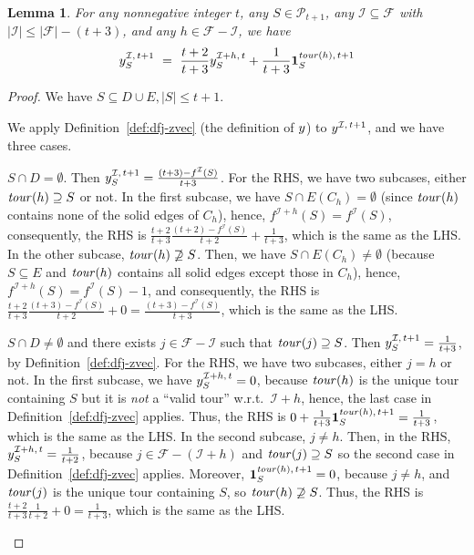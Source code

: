 \documentclass[11pt]{article}
\newtheorem{lemma}[theorem]{Lemma}
\newcommand{\pop}{\mathcal{P}}
\newcommand{\fracset}{\mathcal{F}}
\newcommand{\sgn}{\mathcal{I}}
\newcommand{\onevec}[2]{\textbf{1}^{#1,\,#2}}		\newcommand{\goodfrac}[2]{F^{#1}(#2)}	\newcommand{\szgoodfrac}[2]{f^{#1}(#2)}	\newcommand{\cindex}[1]{\textit{index}(#1)} \newcommand{\indfrac}{h}	\newcommand{\tour}{\textit{tour\/}}
\begin{document}
\begin{lemma}
\label{lemma:dfj-recursive}
For any nonnegative integer $t$,
any $S\in\pop_{t+1}$,
any $\sgn\subseteq \fracset$ with $|\sgn|\leq |\fracset| - (t+3)$,
and any $\indfrac\in\fracset-\sgn$,
we have
\begin{align}
\zvec{\sgn}{t+1}_S ~=~ \frac{t+2}{t+3} \zvec{\sgn+\indfrac}{t}_S +
	\frac{1}{t+3}\onevec{\tour(\indfrac)}{t+1}_S
\end{align}
\end{lemma}
\begin{proof}
We have $S\subseteq D\cup{E}, |S|\leq{t+1}$.

We apply Definition~\ref{def:dfj-zvec} (the definition of $y$)
to $\zvec{\sgn}{t+1}$, and we have three cases.

\begin{description}{
\item[Case~1.]
$S\cap{D}=\emptyset$.
Then $\zvec{\sgn}{t+1}_S = \frac{(t+3)-\szgoodfrac{\sgn}{S}} {t+3}$.
For the RHS, we have two subcases, either $\tour(\indfrac)\supseteq{S}$ or not.
In the first subcase, we have $S\cap E(C_{\indfrac})=\emptyset$
(since $\tour(\indfrac)$ contains none of the solid edges of $C_{\indfrac}$),
hence, $\szgoodfrac{\sgn+\indfrac}{S} = \szgoodfrac{\sgn}{S}$,
consequently, the RHS is
$ \frac{t+2}{t+3} \frac{(t+2)-\szgoodfrac{\sgn}{S}} {t+2} +
	\frac{1}{t+3}$,
which is the same as the LHS.
In the other subcase, $\tour(\indfrac)\not\supseteq{S}$.
Then, we have $S\cap{E(C_{\indfrac})}\not=\emptyset$
(because $S\subseteq{E}$ and $\tour(\indfrac)$ contains all solid edges
except those in $C_{\indfrac}$), hence,
$\szgoodfrac{\sgn+\indfrac}{S} = \szgoodfrac{\sgn}{S} - 1$,
and consequently, the RHS is
$ \frac{t+2}{t+3} \frac{(t+3)-\szgoodfrac{\sgn}{S}} {t+2} + 0 =
	\frac{(t+3)-\szgoodfrac{\sgn}{S}} {t+3}$,
which is the same as the LHS.

\item[Case~2.]
$S\cap{D}\not=\emptyset$ and
there exists $j\in \fracset-\sgn$ such that $\tour(j)\supseteq{S}$.
Then $\zvec{\sgn}{t+1}_S = \frac{1} {t+3}$,
by Definition~\ref{def:dfj-zvec}.
For the RHS, we have two subcases, either $j=\indfrac$ or not.
In the first subcase, we have $\zvec{\sgn+\indfrac}{t}_S = 0$,
because $\tour(\indfrac)$ is the unique tour containing $S$
but it is \emph{not} a ``valid tour'' w.r.t.\ $\sgn+\indfrac$,
hence, the last case in Definition~\ref{def:dfj-zvec} applies.
Thus, the RHS is
$ 0 + \frac{1}{t+3} \onevec{\tour(\indfrac)}{t+1}_S = \frac{1}{t+3}$,
which is the same as the LHS.
In the second subcase, $j\not=\indfrac$.
Then, in the RHS, $\zvec{\sgn+\indfrac}{t}_S = \frac{1} {t+2}$,
because $j\in\fracset-(\sgn+\indfrac)$ and $\tour(j)\supseteq{S}$
so the second case in Definition~\ref{def:dfj-zvec} applies.
Moreover, $\onevec{\tour(\indfrac)}{t+1}_S = 0$,
because $j\not=\indfrac$, and $\tour(j)$ is the unique tour containing $S$,
so $\tour(\indfrac)\not\supseteq{S}$.
Thus, the RHS is
$ \frac{t+2}{t+3} \frac{1} {t+2} + 0 =
	\frac{1}{t+3}$,
which is the same as the LHS.

}
\end{description}
\end{proof}
\end{document}
